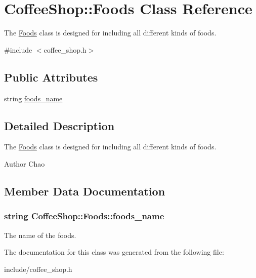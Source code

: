 \hypertarget{classCoffeeShop_1_1Foods}{}\section{Coffee\+Shop\+:\+:Foods Class Reference}
\label{classCoffeeShop_1_1Foods}


The \hyperlink{classCoffeeShop_1_1Foods}{Foods} class is designed for including all different kinds of foods.  




{\ttfamily \#include $<$coffee\+\_\+shop.\+h$>$}

\subsection*{Public Attributes}
\begin{DoxyCompactItemize}
\item 
string \hyperlink{classCoffeeShop_1_1Foods_aa61f4fa7b5a681240da8a51af127b054}{foods\+\_\+name}
\end{DoxyCompactItemize}


\subsection{Detailed Description}
The \hyperlink{classCoffeeShop_1_1Foods}{Foods} class is designed for including all different kinds of foods. 

\begin{DoxyAuthor}{Author}
Chao 
\end{DoxyAuthor}


\subsection{Member Data Documentation}
\subsubsection[{\texorpdfstring{foods\+\_\+name}{foods_name}}]{\setlength{\rightskip}{0pt plus 5cm}string Coffee\+Shop\+::\+Foods\+::foods\+\_\+name}\hypertarget{classCoffeeShop_1_1Foods_aa61f4fa7b5a681240da8a51af127b054}{}\label{classCoffeeShop_1_1Foods_aa61f4fa7b5a681240da8a51af127b054}
The name of the foods. 

The documentation for this class was generated from the following file\+:\begin{DoxyCompactItemize}
\item 
include/coffee\+\_\+shop.\+h\end{DoxyCompactItemize}
